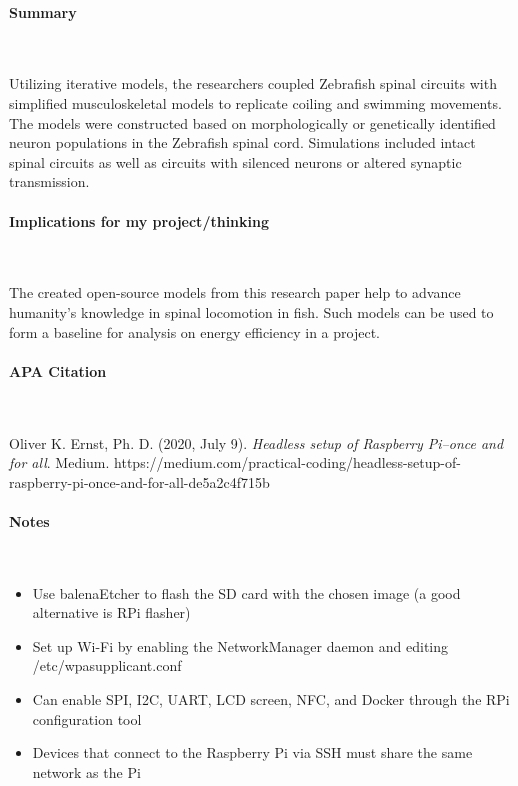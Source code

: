 \vspace*{-0.5cm}
\paragraph{Summary} \

Utilizing iterative models, the researchers coupled Zebrafish spinal circuits with simplified musculoskeletal models to replicate coiling and swimming movements. The models were constructed based on morphologically or genetically identified neuron populations in the Zebrafish spinal cord. Simulations included intact spinal circuits as well as circuits with silenced neurons or altered synaptic transmission. 

\vspace*{-0.5cm}
\paragraph{Implications for my project/thinking} \

The created open-source models from this research paper help to advance humanity's knowledge in spinal locomotion in fish. Such models can be used to form a baseline for analysis on energy efficiency in a project. 

\newpage

\vspace*{-0.5cm}
\paragraph{APA Citation} \

\begin{hangparas}{.25in}{1}
Oliver K. Ernst, Ph. D. (2020, July 9). \textit{Headless setup of Raspberry Pi--once and for all}. Medium. https://medium.com/practical-coding/headless-setup-of-raspberry-pi-once-and-for-all-de5a2c4f715b
\end{hangparas}

\vspace*{-0.5cm}
\paragraph{Notes} \

\begin{itemize}
    \item Use balenaEtcher to flash the SD card with the chosen image (a good alternative is RPi flasher)
    \item Set up Wi-Fi by enabling the NetworkManager daemon and editing /etc/wpasupplicant.conf
    \item Can enable SPI, I2C, UART, LCD screen, NFC, and Docker through the RPi configuration tool
    \item Devices that connect to the Raspberry Pi via SSH must share the same network as the Pi
\end{itemize}
    
